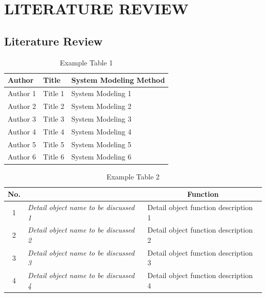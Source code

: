 \chapter[LITERATURE REVIEW]{\\ LITERATURE REVIEW}

\section{Literature Review}
\lipsum[1]

\begin{table}[H]
    \centering
    \caption{Example Table 1}
    \label{t risetPemodelan}
    \begin{tabularx}{\linewidth}{
        |p{}%
        |p{}%
        |p{}|%
    }
        \hline
        Author & Title & System Modeling Method\\ \hline
        Author 1 & Title 1 & System Modeling 1 \\ \hline
        Author 2 & Title 2 & System Modeling 2 \\ \hline
        Author 3 & Title 3 & System Modeling 3 \\ \hline
        Author 4 & Title 4 & System Modeling 4 \\ \hline
        Author 5 & Title 5 & System Modeling 5 \\ \hline
        Author 6 & Title 6 & System Modeling 6 \\ \hline
    \end{tabularx}
\end{table}

\begin{table}[H]
    \centering
    \caption{Example Table 2}
    \label{t blok}
    \begin{tabular}{|c|l|l|}
        \hline
        \rowcolor[HTML]{C0C0C0} 
        {\color[HTML]{000000} No.} & \multicolumn{1}{c|}{\cellcolor[HTML]{C0C0C0}{\color[HTML]{000000} Name}} & \multicolumn{1}{c|}{\cellcolor[HTML]{C0C0C0}Function}  \\ \hline
        \rowcolor[HTML]{FFFFFF} 
        1 & \textit{Detail object name to be discussed 1} & Detail object function description 1 \\ \hline
        2 & \textit{Detail object name to be discussed 2} & Detail object function description 2 \\ \hline
        3 & \textit{Detail object name to be discussed 3} & Detail object function description 3 \\ \hline
        4 & \textit{Detail object name to be discussed 4} & Detail object function description 4 \\ \hline
    \end{tabular}
\end{table}

